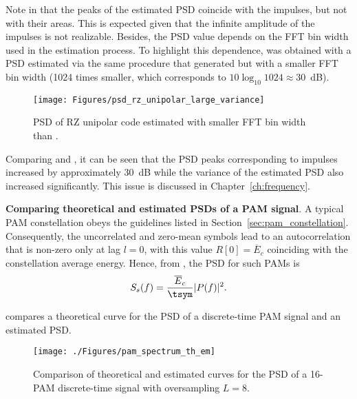 Note in  that the peaks of the estimated PSD coincide
with the impulses, but not with their areas. This is expected given that the infinite amplitude
of the impulses is not realizable. Besides, the PSD value depends on the FFT bin width used in
the estimation process. To highlight this dependence,  
was obtained with a PSD estimated via the same procedure that generated  but with a smaller FFT bin width (1024 times smaller, which corresponds to $10 \log_{10} 1024 \approx 30$~dB).

\begin{figure}[htbp]
\centering
\texttt{[image: Figures/psd\_rz\_unipolar\_large\_variance]}
\caption[{PSD of RZ unipolar code estimated with smaller FFT bin width.}]{PSD of RZ unipolar code estimated with smaller FFT bin width than .\label{fig:psd_rz_unipolar_large_variance}}
\end{figure}

Comparing  and , it can
be seen that the PSD peaks corresponding to impulses increased by approximately 30~dB while
the variance of the estimated PSD also increased significantly. This issue is discussed
in Chapter~\ref{ch:frequency}.
\eExample 

\bExample \textbf{Comparing theoretical and estimated PSDs of a PAM signal}. 
A typical PAM constellation obeys the guidelines listed in Section~\ref{sec:pam_constellation}.
Consequently, the uncorrelated and zero-mean symbols lead to an autocorrelation that is non-zero 
only at lag $l=0$, with this value $R[0] = \overline E_c$ coinciding with the constellation
average energy. Hence, from , the PSD for such PAMs is
\begin{equation}
S_s(f) = \frac{\overline E_c}{\tsym} |P(f)|^2.
\label{eq:pamPSD}
\end{equation}

 compares a theoretical curve for the PSD of a discrete-time PAM signal and an estimated PSD.


\begin{figure}
\centering
\texttt{[image: ./Figures/pam\_spectrum\_th\_em]}
\caption{Comparison of theoretical and estimated curves for the PSD of a 16-PAM discrete-time signal
with oversampling $L=8$.\label{fig:pam_spectrum_th_em}}
\end{figure}

